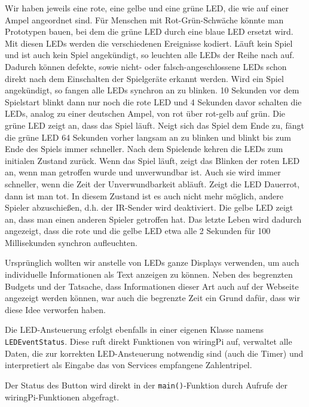 Wir haben jeweils eine rote, eine gelbe und eine grüne LED, die wie auf einer Ampel angeordnet sind.
Für Menschen mit Rot-Grün-Schwäche könnte man Prototypen bauen, bei dem die grüne LED durch eine
blaue LED ersetzt wird.
Mit diesen LEDs werden die verschiedenen Ereignisse kodiert.
Läuft kein Spiel und ist auch kein Spiel angekündigt, so leuchten alle LEDs der Reihe nach auf.
Dadurch können defekte, sowie nicht- oder falsch-angeschlossene LEDs schon direkt nach dem
Einschalten der Spielgeräte erkannt werden.
Wird ein Spiel angekündigt, so fangen alle LEDs synchron an zu blinken.
10 Sekunden vor dem Spielstart blinkt dann nur noch die rote LED und 4 Sekunden davor schalten die
LEDs, analog zu einer deutschen Ampel, von rot über rot-gelb auf grün.
Die grüne LED zeigt an, dass das Spiel läuft.
Neigt sich das Spiel dem Ende zu, fängt die grüne LED 64 Sekunden vorher langsam an zu blinken und
blinkt bis zum Ende des Spiels immer schneller.
Nach dem Spielende kehren die LEDs zum initialen Zustand zurück.
Wenn das Spiel läuft, zeigt das Blinken der roten LED an, wenn man getroffen wurde und unverwundbar
ist.
Auch sie wird immer schneller, wenn die Zeit der Unverwundbarkeit abläuft.
Zeigt die LED Dauerrot, dann ist man tot.
In diesem Zustand ist es auch nicht mehr möglich, andere Spieler abzuschießen, d.h. der IR-Sender
wird deaktiviert.
Die gelbe LED zeigt an, dass man einen anderen Spieler getroffen hat.
Das letzte Leben wird dadurch angezeigt, dass die rote und die gelbe LED etwa alle 2 Sekunden für
100 Millisekunden synchron aufleuchten.

Ursprünglich wollten wir anstelle von LEDs ganze Displays verwenden, um auch individuelle
Informationen als Text anzeigen zu können.
Neben des begrenzten Budgets und der Tatsache, dass Informationen dieser Art auch auf der Webseite
angezeigt werden können, war auch die begrenzte Zeit ein Grund dafür, dass wir diese Idee verworfen
haben.

Die LED-Ansteuerung erfolgt ebenfalls in einer eigenen Klasse namens \texttt{LEDEventStatus}.
Diese ruft direkt Funktionen von wiringPi auf, verwaltet alle Daten, die zur korrekten
LED-Ansteuerung notwendig sind (auch die Timer) und interpretiert als Eingabe das von Services
empfangene Zahlentripel.

Der Status des Button wird direkt in der \texttt{main()}-Funktion durch Aufrufe der
wiringPi-Funktionen abgefragt.

